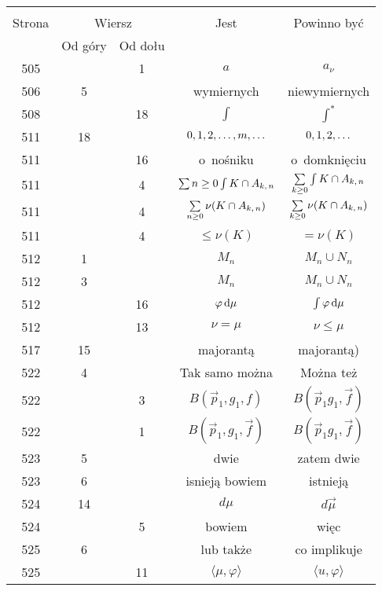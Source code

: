\documentclass[a4paper,11pt]{article}
\begin{document}
\begin{center}
  \begin{tabular}{|c|c|c|c|c|}
    \hline
    & \multicolumn{2}{c|}{} & & \\
    Strona & \multicolumn{2}{c|}{Wiersz} & Jest
                              & Powinno być \\ \cline{2-3}
    & Od góry & Od dołu & & \\
    \hline
    505 & &  1 & $a$ & $a_{ \nu }$ \\
    506 &  5 & & wymiernych & niewymiernych \\
    508 & & 18 & $\int$ & $\int^{ * }$ \\
    511 & 18 & & $0, 1, 2, \ldots, m, \ldots$ & $0, 1, 2, \ldots$ \\
    511 & & 16 & o~nośniku & o~domknięciu \\
    511 & &  4 & $\sum\limits{ n \geq 0 } \int\limits{ K \cap A_{ k,\, n } }$
           & $\sum\limits_{ k \geq 0 } \int\limits{ K \cap A_{ k,\, n } }$ \\
    511 & &  4 & $\sum\limits_{ n \geq 0 } \nu( K \cap A_{ k,\, n } )$
           & $\sum\limits_{ k \geq 0 } \nu( K \cap A_{ k,\, n } )$ \\
    511 & &  4 & $\leq \nu( K )$ & $= \nu( K )$ \\
    512 &  1 & & $M_{ n }$ & $M_{ n } \cup N_{ n }$ \\
    512 &  3 & & $M_{ n }$ & $M_{ n } \cup N_{ n }$ \\
    512 & & 16 & $\varphi\, \mathrm{d} \mu$ & $\int \varphi\, \mathrm{d} \mu$ \\
    512 & & 13 & $\nu = \mu$ & $\nu \leq \mu$ \\
    517 & 15 & & majorantą & majorantą) \\
    522 &  4 & & Tak samo można & Można też \\
    522 & &  3 & $B( \vec{ p }_{ 1 }, g_{ 1 }, f )$
           & $B( \vec{ p }_{ 1 } g_{ 1 }, \vec{ f } )$ \\
    522 & &  1 & $B( \vec{ p }_{ 1 }, g_{ 1 }, \vec{ f } )$
           & $B( \vec{ p }_{ 1 } g_{ 1 }, \vec{ f } )$ \\
    523 &  5 & & dwie & zatem dwie \\
    523 &  6 & & isnieją bowiem & istnieją \\
    524 & 14 & & $d \mu$ & $d \vec{ \mu }$ \\
    524 & &  5 & bowiem & więc \\
    525 &  6 & & lub także & co implikuje \\
    525 & & 11 & $\langle \mu, \varphi \rangle$
           & $\langle u, \varphi \rangle$ \\

\end{tabular}
\end{center}
\end{document}
